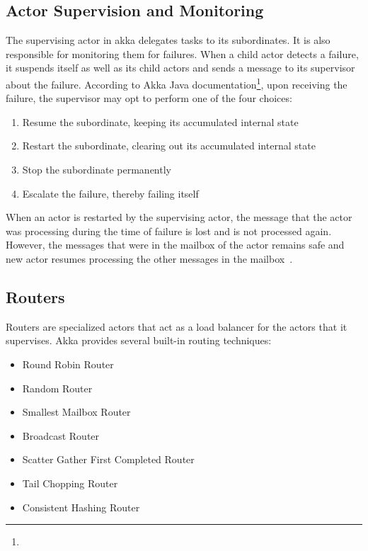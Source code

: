   \subsection{Actor Supervision and Monitoring}
  \label{subsec:supervisionMonitoring}
  The supervising actor in akka delegates tasks to its subordinates. It is also responsible for monitoring them for failures. When a child actor detects a failure, it suspends itself as well as its child actors and sends a message to its supervisor about the failure. According to Akka Java documentation\footnote{}, upon receiving the failure, the supervisor may opt to perform one of the four choices:~\cite{akkaJavaDoc}
  \begin{enumerate}
    \item Resume the subordinate, keeping its accumulated internal state
    \item Restart the subordinate, clearing out its accumulated internal state
    \item Stop the subordinate permanently
    \item Escalate the failure, thereby failing itself
  \end{enumerate}

  When an actor is restarted by the supervising actor, the message that the actor was processing during the time of failure is lost and is not processed again. However, the messages that were in the mailbox of the actor remains safe and new actor resumes processing the other messages in the mailbox~\cite{akkaJavaDoc}.

  \subsection{Routers}
  Routers are specialized actors that act as a load balancer for the actors that it supervises. Akka provides several built-in routing techniques:~\cite{akkaJavaDoc}
  \begin{itemize}
    \item Round Robin Router
    \item Random Router
    \item Smallest Mailbox Router
    \item Broadcast Router
    \item Scatter Gather First Completed Router
    \item Tail Chopping Router
    \item Consistent Hashing Router
  \end{itemize}

